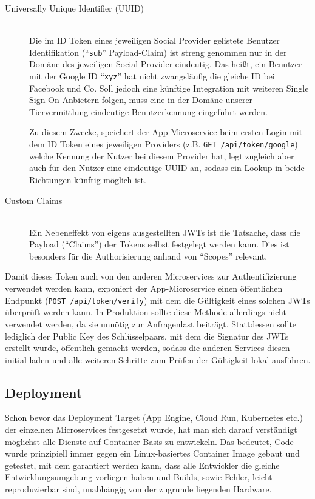 \documentclass{article}
\begin{document}
\begin{description}
	\item[Universally Unique Identifier (UUID)]
	\hfill \\
	Die im ID Token eines jeweiligen Social Provider gelistete Benutzer Identifikation (\enquote{\texttt{sub}} Payload-Claim) ist streng genommen nur in der Domäne des jeweiligen Social Provider eindeutig. Das heißt, ein Benutzer mit der Google ID \enquote{\texttt{xyz}} hat nicht zwangsläufig die gleiche ID bei Facebook und Co. Soll jedoch eine künftige Integration mit weiteren Single Sign-On Anbietern folgen, muss eine in der Domäne unserer Tiervermittlung eindeutige Benutzerkennung eingeführt werden.

	Zu diesem Zwecke, speichert der App-Microservice beim ersten Login mit dem ID Token eines jeweiligen Providers (z.B. \texttt{GET /api/token/google}) welche Kennung der Nutzer bei diesem Provider hat, legt zugleich aber auch für den Nutzer eine eindeutige UUID an, sodass ein Lookup in beide Richtungen künftig möglich ist.

	\item[Custom Claims]
	\hfill \\
	Ein Nebeneffekt von eigens ausgestellten JWTs ist die Tatsache, dass die Payload (\enquote{Claims}) der Tokens selbst festgelegt werden kann. Dies ist besonders für die Authorisierung anhand von \enquote{Scopes} relevant.
\end{description}

Damit dieses Token auch von den anderen Microservices zur Authentifizierung verwendet werden kann, exponiert der App-Microservice einen öffentlichen Endpunkt (\texttt{POST /api/token/verify}) mit dem die Gültigkeit eines solchen JWTs überprüft werden kann. In Produktion sollte diese Methode allerdings nicht verwendet werden, da sie unnötig zur Anfragenlast beiträgt. Stattdessen sollte lediglich der Public Key des Schlüsselpaars, mit dem die Signatur des JWTs erstellt wurde, öffentlich gemacht werden, sodass die anderen Services diesen initial laden und alle weiteren Schritte zum Prüfen der Gültigkeit lokal ausführen.


\subsection{Deployment}
\label{sec:app-deployment}

Schon bevor das Deployment Target (App Engine, Cloud Run, Kubernetes etc.) der einzelnen Microservices festgesetzt wurde, hat man sich darauf verständigt möglichst alle Dienste auf Container-Basis zu entwickeln. Das bedeutet, Code wurde prinzipiell immer gegen ein Linux-basiertes Container Image gebaut und getestet, mit dem garantiert werden kann, dass alle Entwickler die gleiche Entwicklungsumgebung vorliegen haben und Builds, sowie Fehler, leicht reproduzierbar sind, unabhängig von der zugrunde liegenden Hardware.
\end{document}
